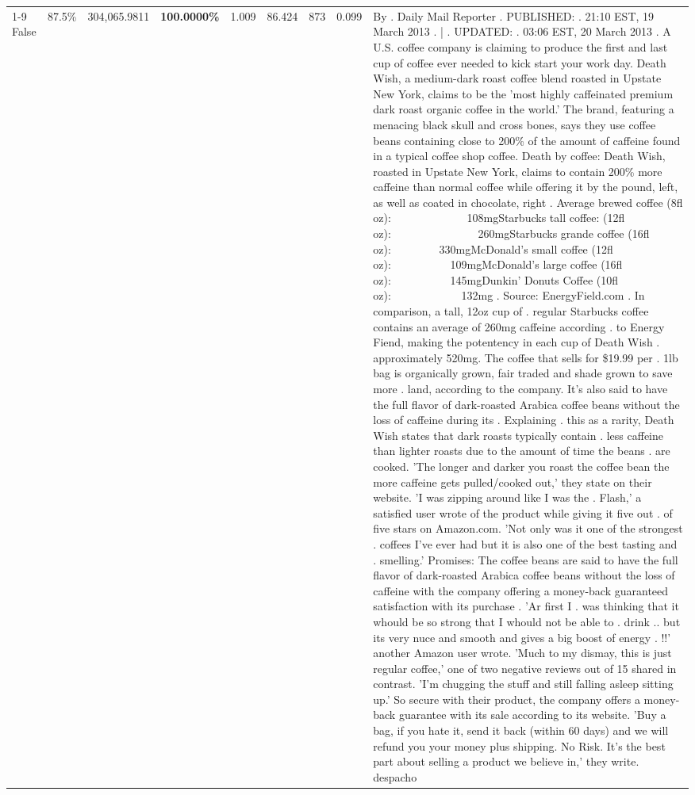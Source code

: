 \begin{table}[H]
{\begin{tabular}{lllrlllll}
\cline{1-9} \cline{2-9}
False & 87.5\% & 304,065.9811 & \bfseries \color{red} 100.0000\% & 1.009 & 86.424 & 873 & 0.099 & By . Daily Mail Reporter . PUBLISHED: . 21:10 EST, 19 March 2013 . | . UPDATED: . 03:06 EST, 20 March 2013 . A U.S. coffee company is claiming to produce the first and last cup of coffee ever needed to kick start your work day. Death Wish, a medium-dark roast coffee blend roasted in Upstate New York, claims to be the 'most highly caffeinated premium dark roast organic coffee in the world.' The brand, featuring a menacing black skull and cross bones, says they use coffee beans containing close to 200\% of the amount of caffeine found in a typical coffee shop coffee. Death by coffee: Death Wish, roasted in Upstate New York, claims to contain 200\% more caffeine than normal coffee while offering it by the pound, left, as well as coated in chocolate, right . Average brewed coffee (8fl oz):              108mgStarbucks tall coffee: (12fl oz):                260mgStarbucks grande coffee (16fl oz):         330mgMcDonald's small coffee (12fl oz):           109mgMcDonald's large coffee (16fl oz):           145mgDunkin' Donuts Coffee (10fl oz):             132mg . Source: EnergyField.com . In comparison, a tall, 12oz cup of . regular Starbucks coffee contains an average of 260mg caffeine according . to Energy Fiend, making the potentency in each cup of Death Wish . approximately 520mg. The coffee that sells for \$19.99 per . 1lb bag is organically grown, fair traded and shade grown to save more . land, according to the company. It's also said to have the full flavor of dark-roasted Arabica coffee beans without the loss of caffeine during its . Explaining . this as a rarity, Death Wish states that dark roasts typically contain . less caffeine than lighter roasts due to the amount of time the beans . are cooked. 'The longer and darker you roast the coffee bean the more caffeine gets pulled/cooked out,' they state on their website. 'I was zipping around like I was the . Flash,' a satisfied user wrote of the product while giving it five out . of five stars on Amazon.com. 'Not only was it one of the strongest . coffees I've ever had but it is also one of the best tasting and . smelling.’ Promises: The coffee beans are said to have the full flavor of dark-roasted Arabica coffee beans without the loss of caffeine with the company offering a money-back guaranteed satisfaction with its purchase . 'Ar first I . was thinking that it whould be so strong that I whould not be able to . drink .. but its very nuce and smooth and gives a big boost of energy . !!' another Amazon user wrote. 'Much to my dismay, this is just regular coffee,' one of two negative reviews out of 15 shared in contrast. 'I'm chugging the stuff and still falling asleep sitting up.' So secure with their product, the company offers a money-back guarantee with its sale according to its website. 'Buy a bag, if you hate it, send it back (within 60 days) and we will refund you your money plus shipping. No Risk. It’s the best part about selling a product we believe in,' they write. despacho \\

\end{tabular}}
\end{table}
